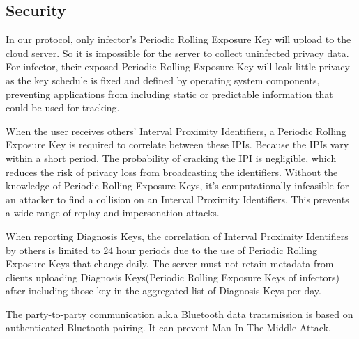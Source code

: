 \documentclass[11pt,en]{elegantpaper}
\begin{document}
\subsection{Security}
In our protocol, only infector's Periodic Rolling Exposure Key will upload to the cloud server. So it is impossible for the server to collect uninfected privacy data. For infector, their exposed Periodic Rolling Exposure Key will leak little privacy as the key schedule is fixed and defined by operating system components, preventing applications from including static or predictable information that could be used for tracking. 

When the user receives others' Interval Proximity Identifiers, a Periodic Rolling Exposure Key is required to correlate between these IPIs. Because the IPIs vary within a short period. The probability of cracking the  IPI  is negligible, which reduces the risk of privacy loss from broadcasting the identifiers. Without the knowledge of Periodic Rolling Exposure Keys, it's computationally infeasible for an attacker to find a collision on an Interval Proximity Identifiers. This prevents a wide range of replay and impersonation attacks. 

When reporting Diagnosis Keys, the correlation of Interval Proximity Identifiers by others is limited to 24 hour periods due to the use of Periodic Rolling Exposure Keys that change daily. The server must not retain metadata from clients uploading Diagnosis Keys(Periodic Rolling Exposure Keys of infectors) after including those key in the aggregated list of Diagnosis Keys per day.

The party-to-party communication a.k.a Bluetooth data transmission is based on authenticated Bluetooth pairing. It can prevent Man-In-The-Middle-Attack. 


\end{document}
